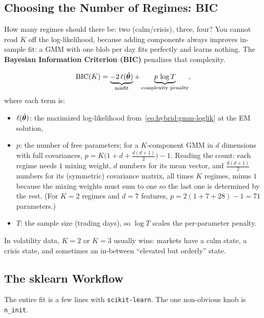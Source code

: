 \subsection{Choosing the Number of Regimes: BIC}
\label{sec:hybrid:bic}

How many regimes should there be: two (calm/crisis), three, four?  You
cannot read $K$ off the log-likelihood, because adding components always
improves in-sample fit: a GMM with one blob per day fits perfectly and
learns nothing.  The \textbf{Bayesian Information Criterion (BIC)}
\citep{Schwarz1978} penalizes that complexity.

\begin{equation}\label{eq:hybrid:bic}
  \text{BIC}(K) = \underbrace{-2\,\ell(\hat{\bm{\theta}})}_{\text{misfit}}
    + \underbrace{p\,\log T}_{\text{complexity penalty}},
\end{equation}
where each term is:
\begin{itemize}
  \item $\ell(\hat{\bm{\theta}})$: the maximized log-likelihood
        from~\eqref{eq:hybrid:gmm-loglik} at the EM solution,
  \item $p$: the number of free parameters; for a $K$-component GMM in
        $d$ dimensions with full covariances,
        $p = K\bigl(1 + d + \tfrac{d(d+1)}{2}\bigr) - 1$.  Reading the
        count: each regime needs $1$ mixing weight, $d$ numbers for its
        mean vector, and $\tfrac{d(d+1)}{2}$ numbers for its (symmetric)
        covariance matrix, all times $K$ regimes, minus $1$ because the
        mixing weights must sum to one so the last one is determined by the
        rest.  (For $K=2$ regimes and $d=7$ features,
        $p = 2(1+7+28) - 1 = 71$ parameters.)
  \item $T$: the sample size (trading days), so $\log T$ scales the
        per-parameter penalty.
\end{itemize}

\begin{intuition}
In volatility data, $K=2$ or $K=3$ usually wins: markets
have a calm state, a crisis state, and sometimes an in-between ``elevated
but orderly'' state.
\end{intuition}

\subsection{The sklearn Workflow}
\label{sec:hybrid:sklearn-gmm}

The entire fit is a few lines with \texttt{scikit-learn}.  The one
non-obvious knob is \texttt{n\_init}.

